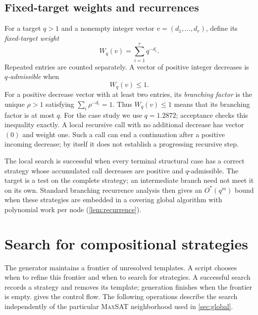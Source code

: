 \documentclass[11pt]{article}
\newcommand{\MaxSAT}{\textnormal{\textsc{MaxSAT}}}
\newcommand{\OhStar}{O^*}
\theoremstyle{definition}
\theoremstyle{remark}
\begin{document}
\subsection{Fixed-target weights and recurrences}
\label{sec:weights}

For a target $q>1$ and a nonempty integer vector $v=(d_1,\ldots,d_r)$,
define its \emph{fixed-target weight}
\begin{equation}
 W_q(v)=\sum_{i=1}^{r}q^{-d_i}.
 \label{eq:weight}
\end{equation}
Repeated entries are counted separately. A vector of positive integer
decreases is \emph{$q$-admissible} when
\begin{equation}
  W_q(v)\le 1.
  \label{eq:target}
\end{equation}
For a positive decrease vector with at least two entries, its
\emph{branching factor} is the unique $\rho>1$ satisfying
$\sum_i\rho^{-d_i}=1$. Thus $W_q(v)\le1$ means that its branching factor
is at most $q$.
For the case study we use $q=1.2872$; acceptance checks this inequality
exactly. A local recursive call with no additional decrease has vector $(0)$
and weight one. Such a call can end a continuation after a positive incoming
decrease; by itself it does not establish a progressing recursive step.


The local search is successful when every terminal structural case has a
correct strategy whose accumulated call decreases are positive and
$q$-admissible. The target is a test on the complete strategy; an intermediate
branch need not meet it on its own. Standard branching recurrence analysis
then gives an $\OhStar(q^m)$ bound when these strategies are embedded in a
covering global algorithm with polynomial work per node
(\cref{lem:recurrence}).

\section{Search for compositional strategies}
\label{sec:automation}
\label{sec:overview}

The generator maintains a frontier of unresolved templates. A script chooses
when to refine this frontier and when to search for strategies. A successful
search records a strategy and removes its template; generation finishes when
the frontier is empty.  gives the control flow. The
following operations describe the search independently of the particular
\MaxSAT{} neighborhood used in \cref{sec:global}.
\end{document}
